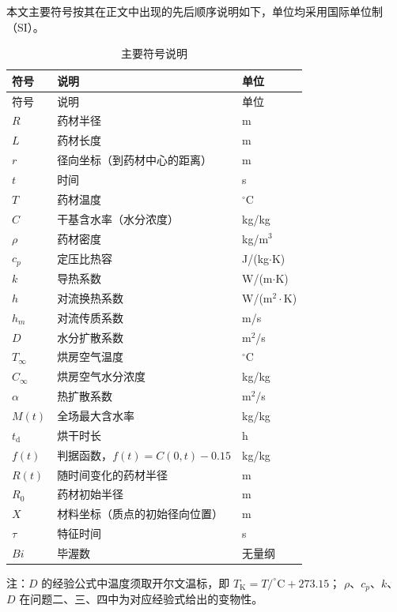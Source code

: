 \documentclass[12pt,a4paper]{article}
\begin{document}
\begin{center}
本文主要符号按其在正文中出现的先后顺序说明如下，单位均采用国际单位制（SI）。
\begin{longtable}{>{\centering\arraybackslash}p{3cm}
                  >{\centering\arraybackslash}p{8cm}
                  >{\centering\arraybackslash}p{2cm}}
\caption{主要符号说明}
\label{tab:symbols}\\
\toprule
符号 & 说明 & 单位\\
\midrule
\endfirsthead

\toprule
符号 & 说明 & 单位\\
\midrule
\endhead

\bottomrule
\endlastfoot

$R$         & 药材半径 & m \\
$L$         & 药材长度 & m \\
$r$         & 径向坐标（到药材中心的距离） & m \\
$t$         & 时间 & s \\
$T$         & 药材温度 & $^\circ$C \\
$C$         & 干基含水率（水分浓度） & kg/kg \\
$\rho$      & 药材密度 & kg/m$^3$ \\
$c_p$       & 定压比热容 & J/(kg$\cdot$K) \\
$k$         & 导热系数 & W/(m$\cdot$K) \\
$h$         & 对流换热系数 & W/(m$^2\cdot$K) \\
$h_m$       & 对流传质系数 & m/s \\
$D$         & 水分扩散系数 & m$^2$/s \\
$T_\infty$  & 烘房空气温度 & $^\circ$C \\
$C_\infty$  & 烘房空气水分浓度 & kg/kg \\
$\alpha$    & 热扩散系数 & m$^2$/s \\
$M(t)$      & 全场最大含水率 & kg/kg \\
$t_{\mathrm d}$     & 烘干时长 & h \\
$f(t)$      & 判据函数，$f(t)=C(0,t)-0.15$ & kg/kg \\
$R(t)$      & 随时间变化的药材半径 & m \\
$R_0$       & 药材初始半径 & m \\
$X$         & 材料坐标（质点的初始径向位置） & m \\
$\tau$      & 特征时间 & s \\
$Bi$        & 毕渥数 & 无量纲 \\

\end{longtable}
注：$D$ 的经验公式中温度须取开尔文温标，即 $T_{\mathrm{K}}=T/^\circ\mathrm{C}+273.15$；
$\rho$、$c_p$、$k$、$D$ 在问题二、三、四中为对应经验式给出的变物性。



\end{center}
\end{document}
